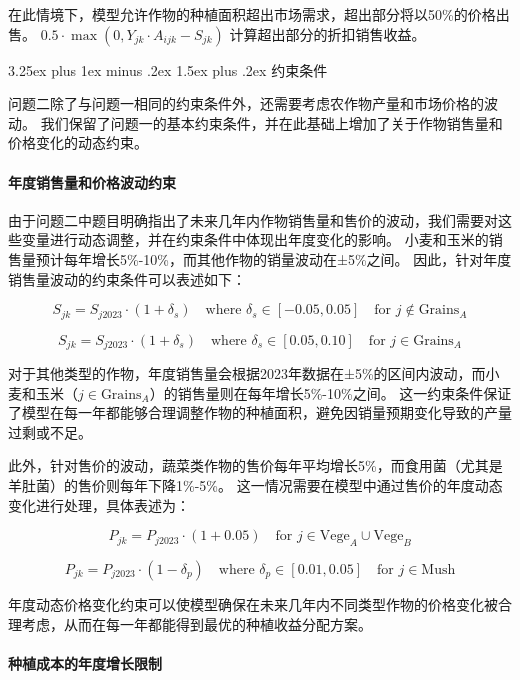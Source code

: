 \documentclass[12pt,a4paper]{nmmcm}
\makeatletter
\renewcommand\subsection{\@startsection{subsection}{2}{0pt}%
    {3.25ex plus 1ex minus .2ex}%
    {1.5ex plus .2ex}%
    {\normalfont\Large\bfseries}}
\makeatother
\begin{document}
在此情境下，模型允许作物的种植面积超出市场需求，超出部分将以50\%的价格出售。
$0.5 \cdot \max(0, Y_{jk} \cdot A_{ijk} - S_{jk})$ 计算超出部分的折扣销售收益。


\subsection{约束条件}

问题二除了与问题一相同的约束条件外，还需要考虑农作物产量和市场价格的波动。
我们保留了问题一的基本约束条件，并在此基础上增加了关于作物销售量和价格变化的动态约束。


\paragraph{年度销售量和价格波动约束}

由于问题二中题目明确指出了未来几年内作物销售量和售价的波动，我们需要对这些变量进行动态调整，并在约束条件中体现出年度变化的影响。
小麦和玉米的销售量预计每年增长5\%-10\%，而其他作物的销量波动在±5\%之间。
因此，针对年度销售量波动的约束条件可以表述如下：

\[
  S_{jk} = S_{j2023} \cdot (1 + \delta_s) \quad \text{where } \delta_s \in [-0.05, 0.05] \quad \text{for } j \notin \text{Grains}_A
\]

\[
  S_{jk} = S_{j2023} \cdot (1 + \delta_s) \quad \text{where } \delta_s \in [0.05, 0.10] \quad \text{for } j \in \text{Grains}_A
\]

对于其他类型的作物，年度销售量会根据2023年数据在±5\%的区间内波动，而小麦和玉米（$j \in \text{Grains}_A$）的销售量则在每年增长5\%-10\%之间。
这一约束条件保证了模型在每一年都能够合理调整作物的种植面积，避免因销量预期变化导致的产量过剩或不足。


此外，针对售价的波动，蔬菜类作物的售价每年平均增长5\%，而食用菌（尤其是羊肚菌）的售价则每年下降1\%-5\%。
这一情况需要在模型中通过售价的年度动态变化进行处理，具体表述为：

\[
  P_{jk} = P_{j2023} \cdot (1 + 0.05) \quad \text{for } j \in \text{Vege}_A \cup \text{Vege}_B
\]

\[
  P_{jk} = P_{j2023} \cdot (1 - \delta_p) \quad \text{where } \delta_p \in [0.01, 0.05] \quad \text{for } j \in \text{Mush}
\]

年度动态价格变化约束可以使模型确保在未来几年内不同类型作物的价格变化被合理考虑，从而在每一年都能得到最优的种植收益分配方案。


\paragraph{种植成本的年度增长限制}
\end{document}
